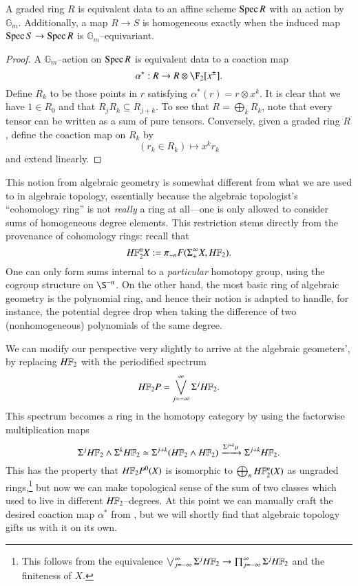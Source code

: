\begin{lemma}\label{GradedAndGmEquivAgree}
A graded ring $R$ is equivalent data to an affine scheme $\operatorname{Spec} R$ with an action by $\mathbb G_m$.  Additionally, a map $R \to S$ is homogeneous exactly when the induced map $\operatorname{Spec} S \to \operatorname{Spec} R$ is $\mathbb G_m$--equivariant.
\end{lemma}
\begin{proof}
A $\mathbb G_m$--action on $\operatorname{Spec} R$ is equivalent data to a coaction map \[\alpha^*: R \to R \otimes \F_2[x^\pm].\]  Define $R_k$ to be those points in $r$ satisfying $\alpha^*(r) = r \otimes x^k$.  It is clear that we have $1 \in R_0$ and that $R_j R_k \subseteq R_{j+k}$.  To see that $R = \bigoplus_k R_k$, note that every tensor can be written as a sum of pure tensors.  Conversely, given a graded ring $R$, define the coaction map on $R_k$ by \[(r_k \in R_k) \mapsto x^k r_k\] and extend linearly.
\end{proof}

This notion from algebraic geometry is somewhat different from what we are used to in algebraic topology, essentially because the algebraic topologist's ``cohomology ring'' is not \emph{really} a ring at all---one is only allowed to consider sums of homogeneous degree elements.  This restriction stems directly from the provenance of cohomology rings: recall that \[\HFtwo^n X := \pi_{-n} F(\Susp^\infty_+ X, \HFtwo).\]  One can only form sums internal to a \emph{particular} homotopy group, using the cogroup structure on $\S^{-n}$.  On the other hand, the most basic ring of algebraic geometry is the polynomial ring, and hence their notion is adapted to handle, for instance, the potential degree drop when taking the difference of two (nonhomogeneous) polynomials of the same degree.

We can modify our perspective very slightly to arrive at the algebraic geometers', by replacing $\HFtwo$ with the periodified spectrum \[\HFtwo P = \bigvee_{j=-\infty}^\infty \Susp^j \HFtwo.\]  This spectrum becomes a ring in the homotopy category by using the factorwise multiplication maps \[\Susp^j \HFtwo \sm \Susp^k \HFtwo \simeq \Susp^{j+k} (\HFtwo \sm \HFtwo) \xrightarrow{\Susp^{j+k} \mu} \Susp^{j+k} \HFtwo.\]  This has the property that $\HFtwo P^0(X)$ is isomorphic to $\bigoplus_n \HFtwo^n(X)$ as ungraded rings,\footnote{This follows from the equivalence $\bigvee_{j=-\infty}^\infty \Susp^j \HFtwo \to \prod_{j=-\infty}^\infty \Susp^j \HFtwo$ and the finiteness of $X$.} but now we can make topological sense of the sum of two classes which used to live in different $\HFtwo$--degrees.  At this point we can manually craft the desired coaction map $\alpha^*$ from , but we will shortly find that algebraic topology gifts us with it on its own.

